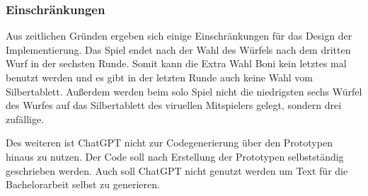 \subsubsection{Einschränkungen}
Aus zeitlichen Gründen ergeben sich einige Einschränkungen für das Design der Implementierung. Das Spiel endet nach der Wahl des Würfels nach dem dritten Wurf in der sechsten Runde. Somit kann die Extra Wahl Boni kein letztes mal benutzt werden und es gibt in der letzten Runde auch keine Wahl vom Silbertablett. Außerdem werden beim solo Spiel nicht die niedrigsten sechs Würfel des Wurfes auf das Silbertablett des viruellen Mitspielers gelegt, sondern drei zufällige.

Des weiteren ist ChatGPT nicht zur Codegenerierung über den Prototypen hinaus zu nutzen. Der Code soll nach Erstellung der Prototypen selbstständig geschrieben werden. Auch soll ChatGPT nicht genutzt werden um Text für die Bachelorarbeit selbst zu generieren.